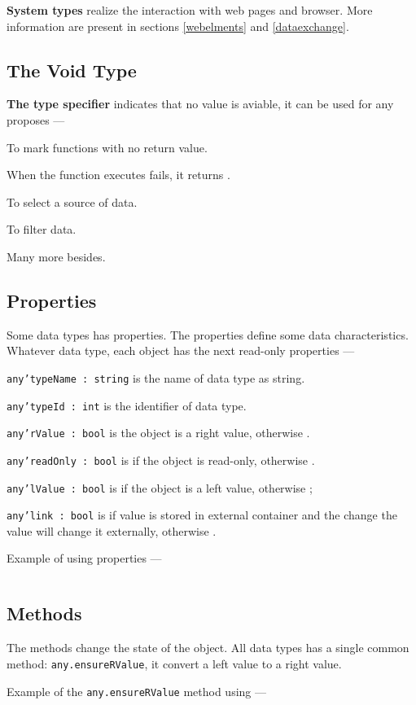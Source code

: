 {\bf System types} realize the interaction with web pages and browser. More information are present in sections \ref{webelments} and \ref{dataexchange}.

\subsection{The Void Type}

{\bf The type specifier \void{}} indicates that no value is aviable, it can be used for any proposes —

\begin{icItems}
\item
	To mark functions with no return value.
\item
	When the function executes fails, it returns \void.
\item
	To select a source of data.
\item
	To filter data.
\item
	Many more besides.
\end{icItems}


\subsection{Properties}

Some data types has properties. The properties define some data characteristics.  Whatever data type, each object has the next read-only properties —

\begin{icItems}
\item
	\texttt{any'typeName : string} is the name of data type as string.
\item
	\texttt{any'typeId : int} is the identifier of data type.
\item
	\texttt{any'rValue : bool} is \true{} the object is a right value, otherwise \false{}.
\item
	\texttt{any'readOnly : bool} is \true{} if the object is read-only, otherwise \false{}.
\item
	\texttt{any'lValue : bool} is \true{} if the object is a left value, otherwise \false{};
\item
	\texttt{any'link : bool} is \true{} if value is stored in external container and the change the value will change it externally, otherwise \false{}.
\end{icItems}

Example of using properties —
\inputminted[linenos]{icl}{../sources/propertiesmain.icL}

\subsection{Methods}

The methods change the state of the object. All data types has a single common method: \texttt{any.ensureRValue}, it convert a left value to a right value.

Example of the \texttt{any.ensureRValue} method using —
\inputminted[linenos]{icl}{../sources/anyensureRValue.icL}
